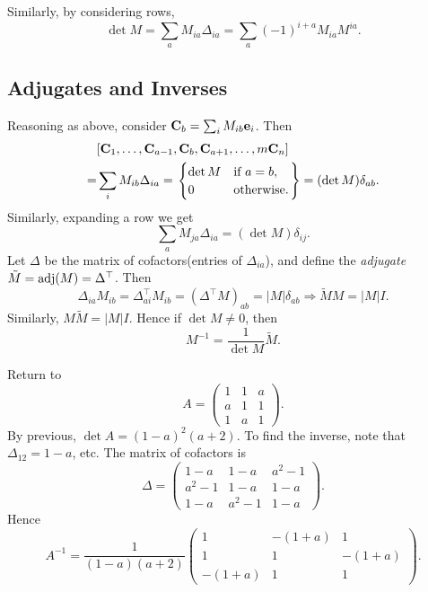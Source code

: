 \documentclass[10pt]{article}
\begin{document}
    Similarly, by considering rows, 
    \[
        \det M = \sum_{a}M_{ia}\Delta_{ia}=\sum_{a}(-1)^{i+a}M_{ia}M^{ia}
    .\]
    \subsection{Adjugates and Inverses}
    Reasoning as above, consider $ {\bf C}_b=\sum_i M_{ib}{\bf e}_i $. Then 
    \[
       \begin{aligned}
            &[{\bf C}_1,\dots,{\bf C}_{a-1},{\bf C}_b,{\bf C}_{a+1},\dots,m{\bf C}_n]\\
            =&\sum_{i}M_{ib}\Delta_{ia}=\left.\begin{cases}
            \det M &\text{if }a=b,\\
            0 &\text{otherwise.}\\
            \end{cases}\right\rbrace  = (\det M )\delta_{ab}.
       \end{aligned} 
    \]
    Similarly, expanding a row we get 
    \[
        \sum_{a}M_{ja}\Delta_{ia} = (\det M)\delta_{ij}
    .\]
    Let $ \Delta $ be the matrix of cofactors(entries of $\Delta_{ia}$), and define the \textit{adjugate} $ \tilde{M}=\operatorname{adj}(M) = \Delta^{\top} $. Then 
    \[
        \Delta_{ia}M_{ib}=\Delta^{\top}_{ai}M_{ib}=(\Delta^{\top} M)_{ab}=|M| \delta_{ab} \Longrightarrow \tilde{M}M=|M|I
    .\] 
    Similarly, $ M \tilde{M}=|M|I $. Hence if $ \det M\neq 0 $, then 
    \[
        M^{-1}=\frac{1}{\det M}\tilde{M}
    .\]
    \begin{example}
        Return to 
        \[
            A=\begin{pmatrix}
                1&1&a\\
                a&1&1\\
                1&a&1
            \end{pmatrix}
        .\]
        By previous, $ \det A=(1-a)^2(a+2) $. To find the inverse, note that $ \Delta_{12}=1-a $, etc. The matrix of cofactors is 
        \[
            \Delta=\begin{pmatrix}
                1-a&1-a&a^2-1\\
                a^2-1&1-a&1-a\\
                1-a&a^2-1&1-a
            \end{pmatrix}
        .\]
        Hence 
        \[
            A^{-1}=\frac{1}{(1-a)(a+2)}\begin{pmatrix}
                    1&-(1+a) & 1 \\
                    1 & 1&-(1+a) \\
                    -(1+a)& 1 & 1
            \end{pmatrix}
        .\]
    \end{example}
\end{document}
